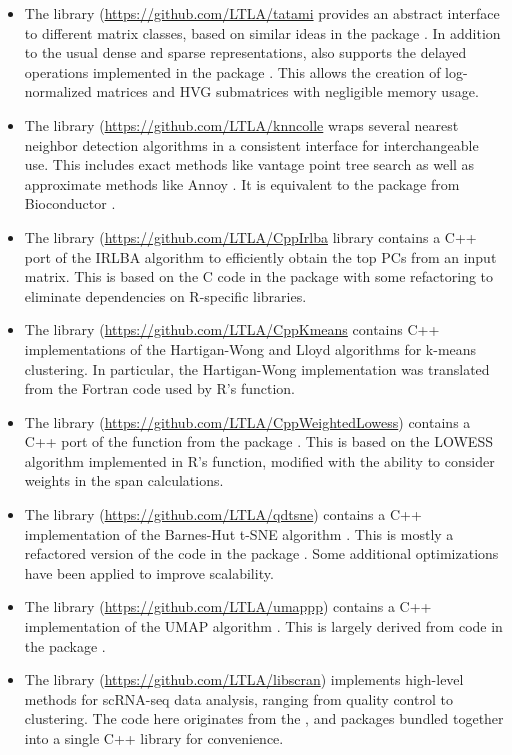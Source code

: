 \documentclass{article}
\begin{document}
\begin{itemize}
\item The  library (\url{https://github.com/LTLA/tatami} provides an abstract interface to different matrix classes, 
based on similar ideas in the  package \cite{lun2018beachmat}. 
In addition to the usual dense and sparse representations,  also supports the delayed operations implemented in the  package \cite{delayedarray}.
This allows the creation of log-normalized matrices and HVG submatrices with negligible memory usage.
\item The  library (\url{https://github.com/LTLA/knncolle} wraps several nearest neighbor detection algorithms in a consistent interface for interchangeable use.
This includes exact methods like vantage point tree search \cite{yianilos1993data} as well as approximate methods like Annoy \cite{annoy}.
It is equivalent to the  package from Bioconductor \cite{biocneighbors}.
\item The  library (\url{https://github.com/LTLA/CppIrlba} library contains a C++ port of the IRLBA algorithm \cite{baglama2005augmented} to efficiently obtain the top PCs from an input matrix.
This is based on the C code in the  package \cite{irlba} with some refactoring to eliminate dependencies on R-specific libraries.
\item The  library (\url{https://github.com/LTLA/CppKmeans} contains C++ implementations of the Hartigan-Wong \cite{hartiganwong} and Lloyd algorithms \cite{lloyd} for k-means clustering.
In particular, the Hartigan-Wong implementation was translated from the Fortran code used by R's  function.
\item The  library (\url{https://github.com/LTLA/CppWeightedLowess}) contains a C++ port of the  function from the  package \cite{ritchie2015limma}.
This is based on the LOWESS algorithm \cite{cleveland1979robust} implemented in R's  function, 
modified with the ability to consider weights in the span calculations.
\item The  library (\url{https://github.com/LTLA/qdtsne}) contains a C++ implementation of the Barnes-Hut t-SNE algorithm \cite{maaten2014accelerating}.
This is mostly a refactored version of the code in the  package \cite{rtsne}.
Some additional optimizations have been applied to improve scalability.
\item The  library (\url{https://github.com/LTLA/umappp}) contains a C++ implementation of the UMAP algorithm \cite{mcinnes2018umap}.
This is largely derived from code in the  package \cite{uwot}.
\item The  library (\url{https://github.com/LTLA/libscran}) implements high-level methods for scRNA-seq data analysis, ranging from quality control to clustering.
The code here originates from the ,  and  packages \cite{lun2016step,lun2017scater} bundled together into a single C++ library for convenience. 
\end{itemize}
\end{document}
